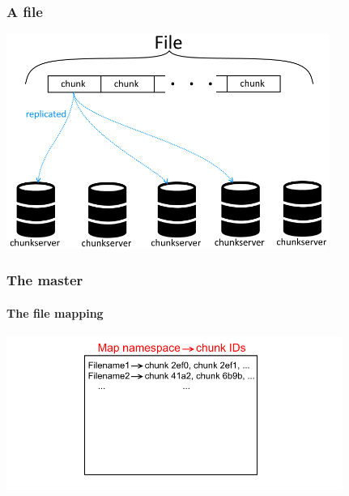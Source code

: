 \documentclass{beamer}
\newcommand{\slideheight}{7cm}
\begin{document}
\begin{frame}
 \frametitle{A file}
 \centering
 \includegraphics[height=\slideheight]{figures/filegfsschema.png}
\end{frame}

\newcommand{\masterpicheight}{5cm}
\begin{frame}
 \frametitle{The master}
 \framesubtitle{The file mapping}
 \centering
 \includegraphics[height=\masterpicheight]{figures/namespaceMapschema.png}
\end{frame}
\end{document}
